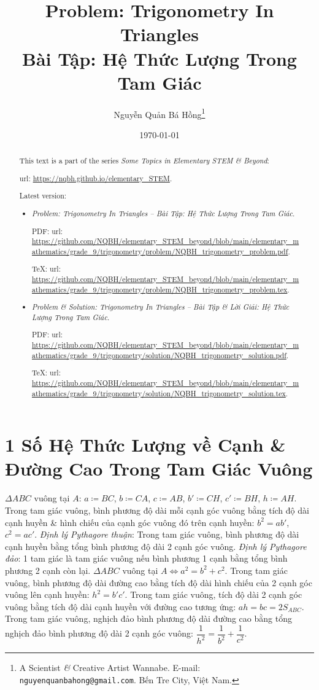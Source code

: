 \documentclass{article}
\title{Problem: Trigonometry In Triangles\\Bài Tập: Hệ Thức Lượng Trong Tam Giác}
\author{Nguyễn Quản Bá Hồng\footnote{A Scientist {\it\&} Creative Artist Wannabe. E-mail: {\tt nguyenquanbahong@gmail.com}. Bến Tre City, Việt Nam.}}
\date{\today}
\begin{document}
\maketitle
\begin{abstract}
	This text is a part of the series {\it Some Topics in Elementary STEM \& Beyond}:
	
	{\sc url}: \url{https://nqbh.github.io/elementary_STEM}.
	
	Latest version:
	\begin{itemize}
		\item {\it Problem: Trigonometry In Triangles -- Bài Tập: Hệ Thức Lượng Trong Tam Giác}.
		
		PDF: {\sc url}: \url{https://github.com/NQBH/elementary_STEM_beyond/blob/main/elementary_mathematics/grade_9/trigonometry/problem/NQBH_trigonometry_problem.pdf}.
		
		\TeX: {\sc url}: \url{https://github.com/NQBH/elementary_STEM_beyond/blob/main/elementary_mathematics/grade_9/trigonometry/problem/NQBH_trigonometry_problem.tex}.
		\item {\it Problem \& Solution: Trigonometry In Triangles -- Bài Tập \& Lời Giải: Hệ Thức Lượng Trong Tam Giác}.
		
		PDF: {\sc url}: \url{https://github.com/NQBH/elementary_STEM_beyond/blob/main/elementary_mathematics/grade_9/trigonometry/solution/NQBH_trigonometry_solution.pdf}.
		
		\TeX: {\sc url}: \url{https://github.com/NQBH/elementary_STEM_beyond/blob/main/elementary_mathematics/grade_9/trigonometry/solution/NQBH_trigonometry_solution.tex}.
	\end{itemize}
\end{abstract}
\tableofcontents


\section{1 Số Hệ Thức Lượng về Cạnh \& Đường Cao Trong Tam Giác Vuông}
$\Delta ABC$ vuông tại $A$: $a\coloneqq BC$, $b\coloneqq CA$, $c\coloneqq AB$, $b'\coloneqq CH$, $c'\coloneqq BH$, $h\coloneqq AH$.  Trong tam giác vuông, bình phương độ dài mỗi cạnh góc vuông bằng tích độ dài cạnh huyền \& hình chiếu của cạnh góc vuông đó trên cạnh huyền: $b^2 = ab'$, $c^2 = ac'$.  {\it Định lý Pythagore thuận}: Trong tam giác vuông, bình phương độ dài cạnh huyền bằng tổng bình phương độ dài 2 cạnh góc vuông. {\it Định lý Pythagore đảo}: 1 tam giác là tam giác vuông nếu bình phương 1 cạnh bằng tổng bình phương 2 cạnh còn lại. $\Delta ABC$ vuông tại $A\Leftrightarrow a^2 = b^2 + c^2$.  Trong tam giác vuông, bình phương độ dài đường cao bằng tích độ dài hình chiếu của 2 cạnh góc vuông lên cạnh huyền: $h^2 = b'c'$.  Trong tam giác vuông, tích độ dài 2 cạnh góc vuông bằng tích độ dài cạnh huyền với đường cao tương ứng: $ah = bc = 2S_{ABC}$.  Trong tam giác vuông, nghịch đảo bình phương độ dài đường cao bằng tổng nghịch đảo bình phương độ dài 2 cạnh góc vuông: $\dfrac{1}{h^2} = \dfrac{1}{b^2} + \dfrac{1}{c^2}$.
\end{document}

